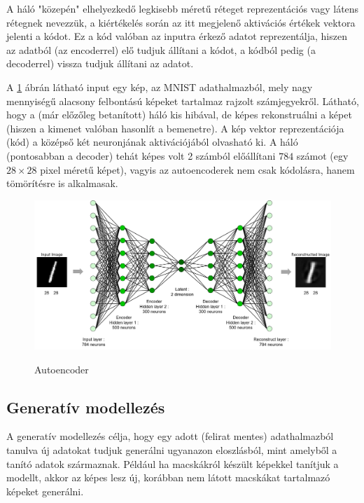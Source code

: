 \documentclass[12pt]{article}
\begin{document}
A háló "közepén" elhelyezkedő legkisebb méretű réteget reprezentációs vagy látens rétegnek nevezzük, a kiértékelés során az itt megjelenő aktivációs értékek vektora jelenti a kódot. Ez a kód valóban az inputra érkező adatot reprezentálja, hiszen az adatból (az encoderrel) elő tudjuk állítani a kódot, a kódból pedig (a decoderrel) vissza tudjuk állítani az adatot.

A \ref{AE_arch2} ábrán látható input egy kép, az MNIST adathalmazból, mely nagy mennyiségű alacsony felbontású képeket tartalmaz rajzolt számjegyekről. Látható, hogy a (már előzőleg betanított) háló kis hibával, de képes rekonstruálni a képet (hiszen a kimenet valóban hasonlít a bemenetre). A kép vektor reprezentációja (kód) a középső két neuronjának aktivációjából olvasható ki. A háló (pontosabban a decoder) tehát képes volt 2 számból előállítani $784$ számot (egy $28\times 28$ pixel méretű képet), vagyis az autoencoderek nem csak kódolásra, hanem tömörítésre is alkalmasak.

\begin{figure}[h!]
\begin{center}
  \label{AE_arch2}
  \includegraphics[width=\linewidth]{AE_arch2.png}
  \caption{Autoencoder}
\end{center}
\end{figure}

\subsection{Generatív modellezés}

A generatív modellezés célja, hogy egy adott (felirat mentes) adathalmazból tanulva új adatokat tudjuk generálni ugyanazon eloszlásból, mint amelyből a tanító adatok származnak. Például ha macskákról készült képekkel tanítjuk a modellt, akkor az képes lesz új, korábban nem látott macskákat tartalmazó képeket generálni.
\end{document}
